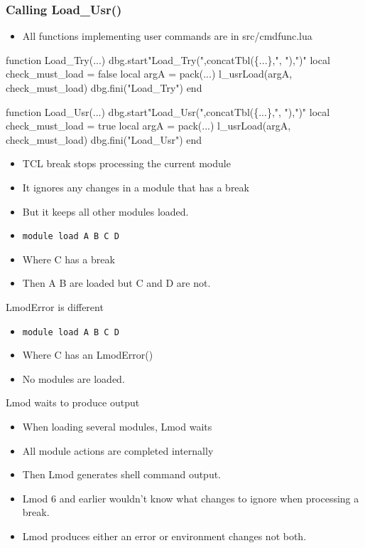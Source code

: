 \documentclass{beamer}
\begin{document}
\begin{frame}[fragile]
    \frametitle{Calling Load\_Usr()}
  \begin{itemize}
    \item All functions implementing user commands are in src/cmdfunc.lua
  \end{itemize}

 {\tiny
    \begin{semiverbatim}
function Load\_Try(...)
   dbg.start{"Load\_Try(",concatTbl(\{...\},", "),")"}
   local check\_must\_load = false
   local argA            = pack(...)
   l\_usrLoad(argA, check\_must\_load)
   dbg.fini("Load\_Try")
end

function Load\_Usr(...)
   dbg.start{"Load\_Usr(",concatTbl(\{...\},", "),")"}
   local check\_must\_load = true
   local argA            = pack(...)
   l\_usrLoad(argA, check\_must\_load)
   dbg.fini("Load\_Usr")
end
    \end{semiverbatim}
}
\end{frame}

\begin{frame}{}
  \begin{itemize}
    \item TCL break stops processing the current module
    \item It ignores any changes in a module that has a break
    \item But it keeps all other modules loaded.
    \item {\color{blue} \texttt{module load A B C D}} 
    \item Where C has a break
    \item Then A B are loaded but C and D are not.
  \end{itemize}
\end{frame}

\begin{frame}{LmodError is different}
  \begin{itemize}
    \item {\color{blue} \texttt{module load A B C D}} 
    \item Where C has an LmodError()
    \item No modules are loaded.
  \end{itemize}
\end{frame}

\begin{frame}{Lmod waits to produce output}
  \begin{itemize}
    \item When loading several modules, Lmod waits
    \item All module actions are completed internally
    \item Then Lmod generates shell command output.
    \item Lmod 6 and earlier wouldn't know what changes to ignore when
      processing a break.
    \item Lmod produces either an error or environment changes
      not both.
  \end{itemize}
\end{frame}
\end{document}
